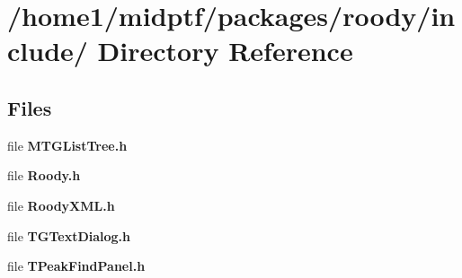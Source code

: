 \section{/home1/midptf/packages/roody/include/ Directory Reference}
\label{dir_4ee451a34230df386623515c9f78ab62}
\subsection*{Files}
\begin{DoxyCompactItemize}
\item 
file {\bf MTGListTree.h}
\item 
file {\bf Roody.h}
\item 
file {\bf RoodyXML.h}
\item 
file {\bf TGTextDialog.h}
\item 
file {\bf TPeakFindPanel.h}
\end{DoxyCompactItemize}
